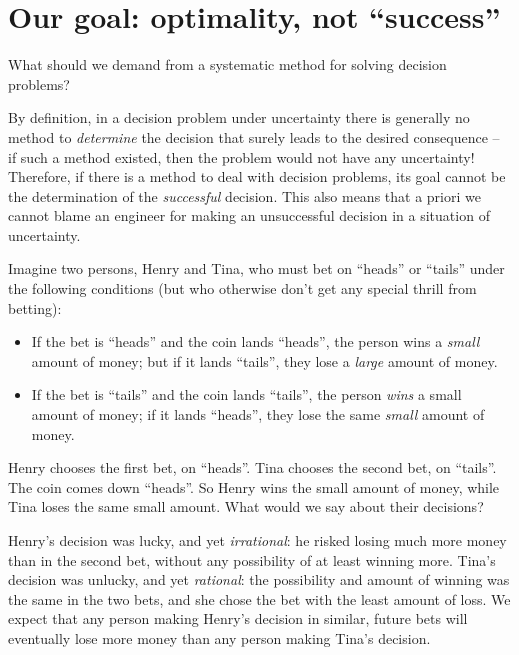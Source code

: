 \documentclass[
  a4paper,
  DIV=11,
  numbers=noendperiod,
  oneside]{scrreprt}
\providecommand{\tightlist}{%
  \setlength{\itemsep}{0pt}\setlength{\parskip}{0pt}}\usepackage{longtable,booktabs,array}
\begin{document}
\hypertarget{our-goal-optimality-not-success}{%
\section{Our goal: optimality, not
``success''}\label{our-goal-optimality-not-success}}

What should we demand from a systematic method for solving decision
problems?

By definition, in a decision problem under uncertainty there is
generally no method to \emph{determine} the decision that surely leads
to the desired consequence -- if such a method existed, then the problem
would not have any uncertainty! Therefore, if there is a method to deal
with decision problems, its goal cannot be the determination of the
\emph{successful} decision. This also means that a priori we cannot
blame an engineer for making an unsuccessful decision in a situation of
uncertainty.

Imagine two persons, Henry and Tina, who must bet on ``heads'' or
``tails'' under the following conditions (but who otherwise don't get
any special thrill from betting):

\begin{itemize}
\tightlist
\item
  If the bet is ``heads'' and the coin lands ``heads'', the person wins
  a \emph{small} amount of money; but if it lands ``tails'', they lose a
  \emph{large} amount of money.
\item
  If the bet is ``tails'' and the coin lands ``tails'', the person
  \emph{wins} a small amount of money; if it lands ``heads'', they lose
  the same \emph{small} amount of money.
\end{itemize}

Henry chooses the first bet, on ``heads''. Tina chooses the second bet,
on ``tails''. The coin comes down ``heads''. So Henry wins the small
amount of money, while Tina loses the same small amount. What would we
say about their decisions?

Henry's decision was lucky, and yet \emph{irrational}: he risked losing
much more money than in the second bet, without any possibility of at
least winning more. Tina's decision was unlucky, and yet
\emph{rational}: the possibility and amount of winning was the same in
the two bets, and she chose the bet with the least amount of loss. We
expect that any person making Henry's decision in similar, future bets
will eventually lose more money than any person making Tina's decision.
\end{document}

